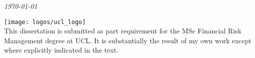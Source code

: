 \begin{titlepage}
\vfill\vfill\vfill %

{\large\textit\today} 


	\texttt{[image: logos/ucl\_logo]}\\[1cm] %




	This dissertation is submitted as part requirement for the MSc Financial Risk Management degree at UCL. It is substantially the result of my own work except where explicitly indicated in the text. 
	




\end{titlepage}
\clearpage 
\newpage 
